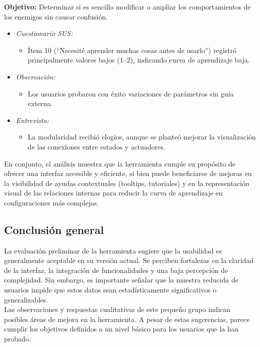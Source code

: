 \textbf{Objetivo:} Determinar si es sencillo modificar o ampliar los comportamientos de los enemigos sin causar confusión.

\begin{itemize}
  \item \emph{Cuestionario SUS:}
    \begin{itemize}
      \item Ítem 10 (“Necesité aprender muchas cosas antes de usarlo”) registró principalmente valores bajos (1–2), indicando curva de aprendizaje baja.
    \end{itemize}
  \item \emph{Observación:}
    \begin{itemize}
      \item Los usuarios probaron con éxito variaciones de parámetros sin guía externa.
    \end{itemize}
  \item \emph{Entrevista:}
    \begin{itemize}
      \item La modularidad recibió elogios, aunque se planteó mejorar la visualización de las conexiones entre estados y actuadores.
    \end{itemize}
\end{itemize}

En conjunto, el análisis muestra que la herramienta cumple su propósito de ofrecer una interfaz accesible y eficiente, si bien puede beneficiarse de mejoras en la visibilidad de ayudas contextuales (tooltips, tutoriales) y en la representación visual de las relaciones internas para reducir la curva de aprendizaje en configuraciones más complejas.
\subsection{Conclusión general}

La evaluación preliminar de la herramienta sugiere que la usabilidad es generalmente aceptable en su versión actual. Se perciben fortalezas en la claridad de la interfaz, la integración de funcionalidades y una baja percepción de complejidad. Sin embargo, es importante señalar que la muestra reducida de usuarios impide que estos datos sean estadísticamente significativos o generalizables.\\

Las observaciones y respuestas cualitativas de este pequeño grupo indican posibles áreas de mejora en la herramienta. A pesar de estas sugerencias, parece cumplir los objetivos definidos a un nivel básico para los usuarios que la han probado.

